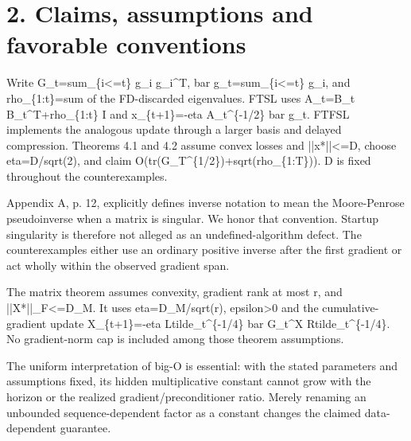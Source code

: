 \documentclass[10pt]{article}
\begin{document}
\section*{2. Claims, assumptions and favorable conventions}
Write G\_t=sum\_\{i<=t\} g\_i g\_i\textasciicircum{}T, bar g\_t=sum\_\{i<=t\} g\_i, and rho\_\{1:t\}=sum of the FD-discarded eigenvalues. FTSL uses A\_t=B\_t B\_t\textasciicircum{}T+rho\_\{1:t\} I and x\_\{t+1\}=-eta A\_t\textasciicircum{}\{-1/2\} bar g\_t. FTFSL implements the analogous update through a larger basis and delayed compression. Theorems 4.1 and 4.2 assume convex losses and ||x*||<=D, choose eta=D/sqrt(2), and claim O(tr(G\_T\textasciicircum{}\{1/2\})+sqrt(rho\_\{1:T\})). D is fixed throughout the counterexamples.\par
Appendix A, p. 12, explicitly defines inverse notation to mean the Moore-Penrose pseudoinverse when a matrix is singular. We honor that convention. Startup singularity is therefore not alleged as an undefined-algorithm defect. The counterexamples either use an ordinary positive inverse after the first gradient or act wholly within the observed gradient span.\par
The matrix theorem assumes convexity, gradient rank at most r, and ||X*||\_F<=D\_M. It uses eta=D\_M/sqrt(r), epsilon>0 and the cumulative-gradient update X\_\{t+1\}=-eta Ltilde\_t\textasciicircum{}\{-1/4\} bar G\_t\textasciicircum{}X Rtilde\_t\textasciicircum{}\{-1/4\}. No gradient-norm cap is included among those theorem assumptions.\par
The uniform interpretation of big-O is essential: with the stated parameters and assumptions fixed, its hidden multiplicative constant cannot grow with the horizon or the realized gradient/preconditioner ratio. Merely renaming an unbounded sequence-dependent factor as a constant changes the claimed data-dependent guarantee.\par
\end{document}
